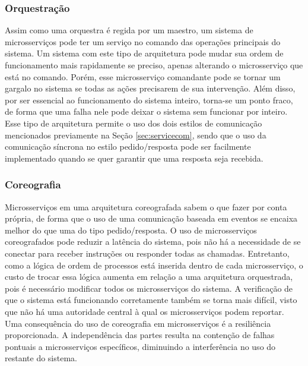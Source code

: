 \subsubsection{\textbf{Orquestração}} Assim como uma orquestra é regida por um maestro, um sistema de microsserviços pode ter um serviço no comando das operações principais do sistema. Um sistema com este tipo de arquitetura pode mudar sua ordem de funcionamento mais rapidamente se preciso, apenas alterando o microsserviço que está no comando. Porém, esse microsserviço comandante pode se tornar um gargalo no sistema se todas as ações precisarem de sua intervenção. Além disso, por ser essencial ao funcionamento do sistema inteiro, torna-se um ponto fraco, de forma que uma falha nele pode deixar o sistema sem funcionar por inteiro. 
Esse tipo de arquitetura permite o uso dos dois estilos de comunicação mencionados previamente na Seção \ref{sec:servicecom}, sendo que o uso da comunicação síncrona no estilo pedido/resposta pode ser facilmente implementado quando se quer garantir que uma resposta seja recebida. 

\subsubsection{\textbf{Coreografia}}
Microsserviços em uma arquitetura coreografada sabem o que fazer por conta própria, de forma que o uso de uma comunicação baseada em eventos se encaixa melhor do que uma do tipo pedido/resposta. O uso de microsserviços coreografados pode reduzir a latência do sistema, pois não há a necessidade de se conectar para receber instruções ou responder todas as chamadas. Entretanto, como a lógica de ordem de processos está inserida dentro de cada microsserviço, o custo de trocar essa lógica aumenta em relação a uma arquitetura orquestrada, pois é necessário modificar todos os microsserviços do sistema. A verificação de que o sistema está funcionando corretamente também se torna mais difícil, visto que não há uma autoridade central à qual os microsserviços podem reportar. Uma consequência do uso de coreografia em microsserviços é a resiliência proporcionada. A independência das partes resulta na contenção de falhas pontuais a microsserviços específicos, diminuindo a interferência no uso do restante do sistema.




